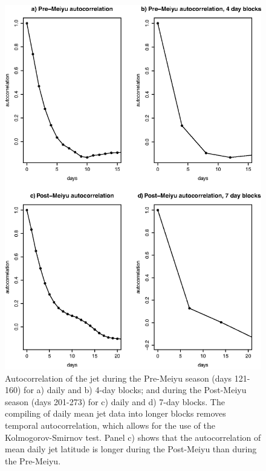 \documentclass[draft,grl]{agutexSI}
\begin{document}
\begin{article}
\begin{figure}

\noindent\includegraphics[width=30pc]{Figures/S5}
\caption{Autocorrelation of the jet during the Pre-Meiyu season (days 121-160) for a) daily and b) 4-day blocks; and during the Post-Meiyu season (days 201-273) for c) daily and d) 7-day blocks. The compiling of daily mean jet data into longer blocks removes temporal autocorrelation, which allows for the use of the Kolmogorov-Smirnov test. Panel c) shows that the autocorrelation of mean daily jet latitude is longer during the Post-Meiyu than during the Pre-Meiyu.}
\end{figure}

\end{article}
\end{document}
